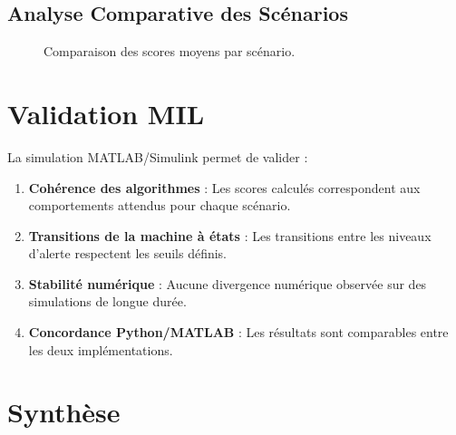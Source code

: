 \subsection{Analyse Comparative des Scénarios}

\begin{figure}[H]
\centering
{}
\caption{Comparaison des scores moyens par scénario.}
\label{fig:score_comparison}
\end{figure}

\section{Validation MIL}

La simulation MATLAB/Simulink permet de valider :

\begin{enumerate}[leftmargin=2cm]
    \item \textbf{Cohérence des algorithmes} : Les scores calculés correspondent aux comportements attendus pour chaque scénario.
    \item \textbf{Transitions de la machine à états} : Les transitions entre les niveaux d'alerte respectent les seuils définis.
    \item \textbf{Stabilité numérique} : Aucune divergence numérique observée sur des simulations de longue durée.
    \item \textbf{Concordance Python/MATLAB} : Les résultats sont comparables entre les deux implémentations.
\end{enumerate}

\section{Synthèse}

